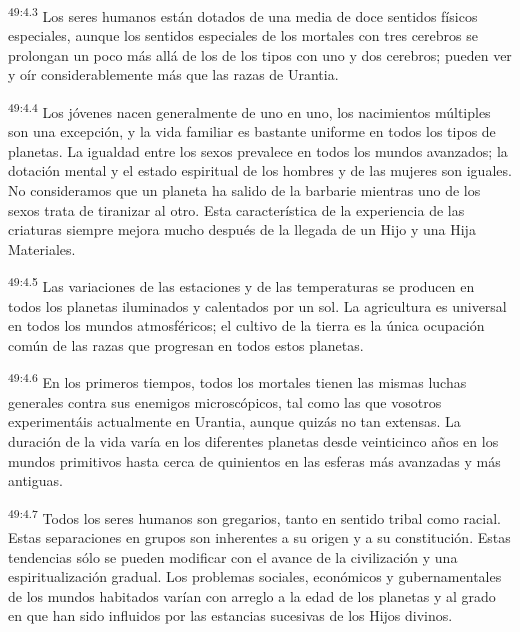 \par
\textsuperscript{49:4.3} Los seres humanos están dotados de una media de doce sentidos físicos especiales, aunque los sentidos especiales de los mortales con tres cerebros se prolongan un poco más allá de los de los tipos con uno y dos cerebros; pueden ver y oír considerablemente más que las razas de Urantia.

\par
\textsuperscript{49:4.4} Los jóvenes nacen generalmente de uno en uno, los nacimientos múltiples son una excepción, y la vida familiar es bastante uniforme en todos los tipos de planetas. La igualdad entre los sexos prevalece en todos los mundos avanzados; la dotación mental y el estado espiritual de los hombres y de las mujeres son iguales. No consideramos que un planeta ha salido de la barbarie mientras uno de los sexos trata de tiranizar al otro. Esta característica de la experiencia de las criaturas siempre mejora mucho después de la llegada de un Hijo y una Hija Materiales.

\par
\textsuperscript{49:4.5} Las variaciones de las estaciones y de las temperaturas se producen en todos los planetas iluminados y calentados por un sol. La agricultura es universal en todos los mundos atmosféricos; el cultivo de la tierra es la única ocupación común de las razas que progresan en todos estos planetas.

\par
\textsuperscript{49:4.6} En los primeros tiempos, todos los mortales tienen las mismas luchas generales contra sus enemigos microscópicos, tal como las que vosotros experimentáis actualmente en Urantia, aunque quizás no tan extensas. La duración de la vida varía en los diferentes planetas desde veinticinco años en los mundos primitivos hasta cerca de quinientos en las esferas más avanzadas y más antiguas.

\par
\textsuperscript{49:4.7} Todos los seres humanos son gregarios, tanto en sentido tribal como racial. Estas separaciones en grupos son inherentes a su origen y a su constitución. Estas tendencias sólo se pueden modificar con el avance de la civilización y una espiritualización gradual. Los problemas sociales, económicos y gubernamentales de los mundos habitados varían con arreglo a la edad de los planetas y al grado en que han sido influidos por las estancias sucesivas de los Hijos divinos.


